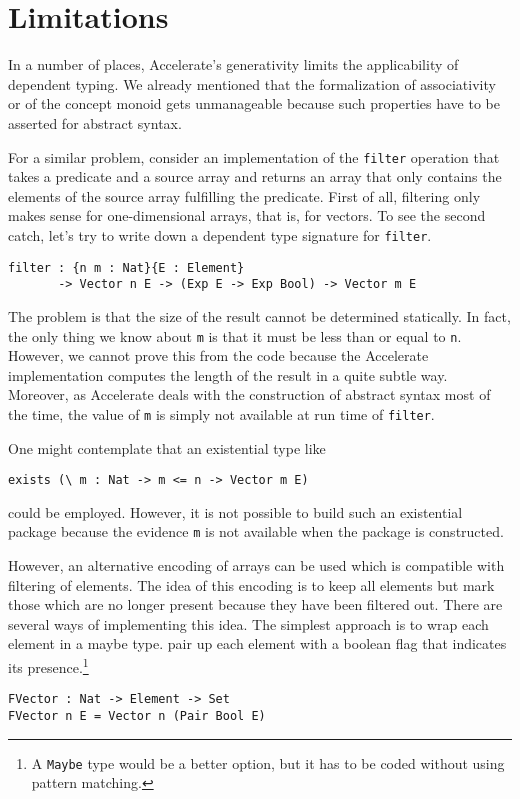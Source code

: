 \documentclass{llncs}
\begin{document}
\section{Limitations}
\label{sec:limitations}

In a number of places, Accelerate's generativity limits the
applicability of dependent typing. We already mentioned that the
formalization of associativity or of the concept monoid gets
unmanageable because such properties have to be asserted for abstract syntax.

For a similar problem, consider an implementation of the \texttt{filter}
operation that takes a predicate and a source array and returns an
array that only contains the elements of the source array fulfilling
the predicate.  First of all, filtering only makes sense for
one-dimensional arrays, that is, for vectors. To see the second catch,
let's try to write down a dependent type signature for \texttt{filter}.
\begin{verbatim}
filter : {n m : Nat}{E : Element}
       -> Vector n E -> (Exp E -> Exp Bool) -> Vector m E
\end{verbatim}
The problem is that the size of the result
cannot be determined statically. In fact, the only thing we know about
\texttt{m} is that it must be less than or equal to
\texttt{n}. However, we cannot prove this from the code because the
Accelerate implementation computes the length of the result in a quite
subtle way. Moreover, as Accelerate deals with the construction of
abstract syntax most of the time, the value of \texttt{m} is simply
not available at run time of \texttt{filter}. 

One might contemplate that an existential type like
\begin{verbatim}
exists (\ m : Nat -> m <= n -> Vector m E)
\end{verbatim}
could be employed. However, it is not possible to build such an
existential package because the evidence \texttt{m} is not available
when the package is constructed.

However, an alternative encoding of arrays can be
used which is compatible with filtering of elements. The idea of this
encoding is to keep all elements but mark those which are no longer
present because they have been filtered out.
There are several ways of implementing this idea. The simplest
approach is to wrap each element in a maybe type.
pair up each element with a boolean flag that indicates
its presence.\footnote{A \texttt{Maybe} type would be a better option,
  but it has to be coded without using pattern matching.}
\begin{verbatim}
FVector : Nat -> Element -> Set
FVector n E = Vector n (Pair Bool E)
\end{verbatim}
\end{document}
